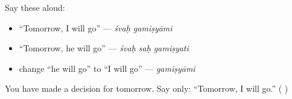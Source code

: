 Say these aloud:

\begin{itemize}
\raggedright
  \item “Tomorrow, I will go” — \emph{śvaḥ gamiṣyāmi}
  \item “Tomorrow, he will go” — \emph{śvaḥ saḥ gamiṣyati}
  \item change “he will go” to “I will go” — \emph{gamiṣyāmi}
\end{itemize}

\begin{tcolorbox}[breakable,colback=teal!4,colframe=teal!35!black,title={Before you move on}]
You have made a decision for tomorrow. Say only: “Tomorrow, I will go.” (\textbf{ })
\end{tcolorbox}
